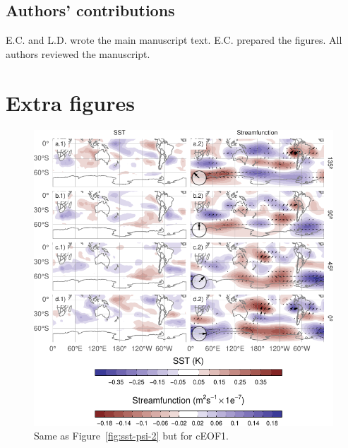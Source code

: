\documentclass[pdflatex,sn-basic]{sn-jnl}
\theoremstyle{thmstyleone}%
\theoremstyle{thmstyletwo}%
\theoremstyle{thmstylethree}%
\begin{document}
\hypertarget{authors-contributions}{%
\subsection*{Authors' contributions}\label{authors-contributions}}

E.C. and L.D. wrote the main manuscript text. E.C. prepared the figures. All authors reviewed the manuscript.

\appendix


\hypertarget{extra-figures}{%
\section{Extra figures}\label{extra-figures}}

\newpage



\begin{figure}
\includegraphics{../figures/sst-psi-1-1} \caption{Same as Figure~\ref{fig:sst-psi-2} but for cEOF1.}\label{fig:sst-psi-1}
\end{figure}
\end{document}

